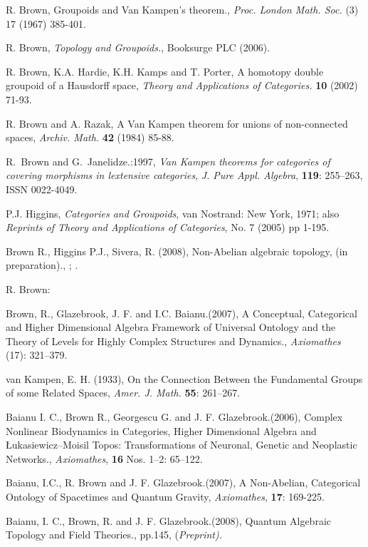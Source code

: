 \documentclass[12pt]{article}
\theoremstyle{plain}
\theoremstyle{definition}
\numberwithin{equation}{section}
\begin{document}
\begin{thebibliography}{9}

R. Brown, Groupoids and Van Kampen's theorem., {\em Proc. London Math. Soc.} (3) 17 (1967) 385-401. 

R. Brown, {\em Topology and Groupoids.}, Booksurge PLC (2006).

R. Brown, K.A. Hardie, K.H. Kamps  and T. Porter, A homotopy double groupoid of a Hausdorff
space, {\em Theory and Applications of Categories.} \textbf{10} (2002) 71-93.
 
R. Brown and A. Razak, A Van Kampen theorem for unions of non-connected spaces, {\em Archiv. Math.} \textbf{42} (1984) 85-88. 

R.~Brown and G.~Janelidze.:1997, {\em Van {K}ampen theorems for categories of covering morphisms in lextensive categories\/}, \emph{J. Pure Appl. Algebra}, \textbf{119}:  255--263, ISSN 0022-4049.

P.J. Higgins, {\em Categories and Groupoids}, van Nostrand: New York, 1971; also {\em Reprints of Theory and Applications of Categories}, No. 7 (2005) pp 1-195.

Brown R., Higgins P.J., Sivera, R. (2008), Non-Abelian algebraic topology, (in preparation).,
;
.

R. Brown: 

Brown, R., Glazebrook, J. F. and I.C. Baianu.(2007), A Conceptual, Categorical and Higher Dimensional Algebra Framework of Universal Ontology and the Theory of Levels for Highly Complex Structures and Dynamics., \emph{Axiomathes} (17): 321--379.

van Kampen, E. H. (1933), On the Connection Between the Fundamental
Groups of some Related Spaces, \emph{Amer. J. Math.} \textbf{55}: 261--267.

Baianu I. C., Brown R., Georgescu G. and J. F. Glazebrook.(2006), Complex Nonlinear Biodynamics in Categories, Higher Dimensional Algebra and \L{}ukasiewicz--Moisil Topos: Transformations of Neuronal, Genetic and Neoplastic Networks., \emph{Axiomathes}, \textbf{16} Nos. 1--2: 65--122.

Baianu, I.C.,  R. Brown and J. F. Glazebrook.(2007), A Non-Abelian, Categorical Ontology of Spacetimes and Quantum Gravity, {\em Axiomathes}, \textbf{17}: 169-225.

Baianu, I. C., Brown, R. and J. F. Glazebrook.(2008), Quantum Algebraic Topology and Field Theories., pp.145,
(\em Preprint).
 
\end{thebibliography}
\end{document}
